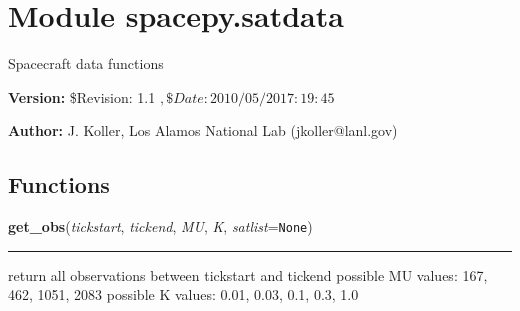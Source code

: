 %
%
%


\section{Module spacepy.satdata}

    \label{spacepy:satdata}
Spacecraft data functions

\textbf{Version:} \$Revision: 1.1 $, \$Date: 2010/05/20 17:19:45 $



\textbf{Author:} J. Koller, Los Alamos National Lab (jkoller@lanl.gov)





  \subsection{Functions}

    \label{spacepy:satdata:get_obs}

    \vspace{0.5ex}

\hspace{.8\funcindent}\begin{boxedminipage}{\funcwidth}

    \raggedright \textbf{get\_obs}(\textit{tickstart}, \textit{tickend}, \textit{MU}, \textit{K}, \textit{satlist}={\tt None})

    \vspace{-1.5ex}

    \rule{\textwidth}{0.5\fboxrule}
\setlength{\parskip}{2ex}
    return all observations between tickstart and tickend possible MU 
    values: 167, 462, 1051, 2083 possible K values: 0.01, 0.03, 0.1, 0.3, 
    1.0

\setlength{\parskip}{1ex}
    \end{boxedminipage}

